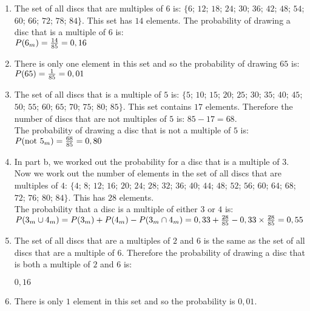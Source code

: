 \begin{solutions}{}
{\begin{enumerate}[itemsep=5pt, label=\textbf{\arabic*}. ]
\begin{enumerate}[noitemsep, label=\textbf{(\alph*)} ]
    \item The set of all discs that are multiples of $6$ is: $\{6$; $ 12$; $ 18$; $ 24$; $ 30$; $ 36$; $ 42$; $ 48$; $ 54$; $ 60$; $ 66$; $ 72$; $ 78$; $ 84\}$. This set has $14$ elements.
    The probability of drawing a disc that is a multiple of $6$ is:\\
    $P(6_m) = \frac{14}{85}\\
	    = 0,16$

    \item There is only one element in this set and so the probability of drawing $65$ is:\\
    $P(65) = \frac{1}{85}\\
	   = 0,01$

    \item The set of all discs that is a multiple of $5$ is: $\{5$; $ 10$; $ 15$; $ 20$; $ 25$; $ 30$; $ 35$; $ 40$; $ 45$; $ 50$; $ 55$; $ 60$; $ 65$; $ 70$; $ 75$; $ 80$; $ 85\}$. This set contains $17$ elements. Therefore the number of discs that are not multiples of $5$ is: $85 − 17 = 68$.\\
   
    The probability of drawing a disc that is not a multiple of $5$ is:\\
    $P(\mbox{not }5_m) = \frac{68}{85}\\
	       = 0,80$

    \item In part b, we worked out the probability for a disc that is a multiple of $3$. Now we work out the number of elements in the set of all discs that are multiples of $4$: $\{4$; $ 8$; $ 12$; $ 16$; $ 20$; $ 24$; $ 28$; $ 32$; $ 36$; $ 40$; $ 44$; $ 48$; $ 52$; $ 56$; $ 60$; $ 64$; $ 68$; $ 72$; $ 76$; $ 80$; $ 84\}$. This has $28$ elements.\\
    
    The probability that a disc is a multiple of either $3$ or $4$ is:\\
    $P(3_m \cup 4_m) = P(3_m) + P(4_m) - P(3_m \cap 4_m)\\
    = 0,33 + \frac{28}{85} - 0,33 \times \frac{28}{85}\\
    = 0,55$
    
    \item The set of all discs that are a multiples of $2$ and $6$ is the same as the set of all discs that are a multiple of $6$. Therefore the probability of drawing a disc that is both a multiple of $2$ and $6$ is:
 
    $0,16$
    
    \item There is only $1$ element in this set and so the probability is $0,01$.
    \end{enumerate}

\end{enumerate}}
\end{solutions}


